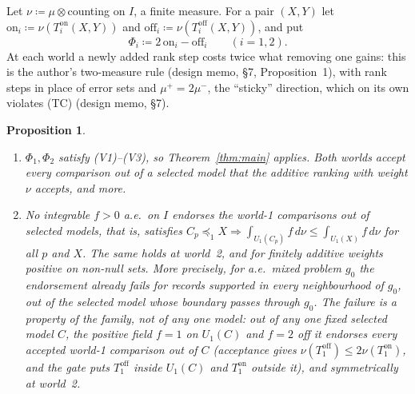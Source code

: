 \documentclass[11pt]{article}
\newtheorem{proposition}[theorem]{Proposition}
\theoremstyle{definition}\newtheorem{definition}[theorem]{Definition}
\theoremstyle{remark}\newtheorem{remark}[theorem]{Remark}
\newcommand{\on}{\mathrm{on}}
\newcommand{\off}{\mathrm{off}}
\begin{document}
Let $\nu\coloneqq\mu\otimes$counting on $I$, a finite measure. For a pair
$(X,Y)$ let $\on_i\coloneqq\nu(T^\on_i(X,Y))$ and
$\off_i\coloneqq\nu(T^\off_i(X,Y))$, and put
\[
 \Phi_i\coloneqq2\,\on_i-\off_i\qquad(i=1,2).
\]
At each world a newly added rank step costs twice what removing one gains:
this is the author's two-measure rule (design memo, \S7, Proposition~1), with
rank steps in place of error sets and $\mu^+=2\mu^-$, the ``sticky''
direction, which on its own violates (TC) (design memo, \S7).

\begin{proposition}\label{prop:instance}
\begin{enumerate}[label=(\alph*),leftmargin=*,itemsep=2pt]
\item $\Phi_1,\Phi_2$ satisfy (V1)--(V3), so Theorem~\ref{thm:main} applies.
Both worlds accept every comparison out of a selected model that the additive
ranking with weight $\nu$ accepts, and more.
\item No integrable $f>0$ a.e.\ on $I$ endorses the world-1 comparisons out of
selected models, that is, satisfies
$C_p\preceq_1X\Rightarrow\int_{U_1(C_p)}f\,d\nu\le\int_{U_1(X)}f\,d\nu$ for all
$p$ and $X$. The same holds at world~2, and for finitely additive weights
positive on non-null sets. More precisely, for a.e.\ mixed problem $g_0$ the
endorsement already fails for records supported in every neighbourhood of
$g_0$, out of the selected model whose boundary passes through $g_0$. The
failure is a property of the family, not of any one model: out of any one fixed
selected model $C$, the positive field $f=1$ on $U_1(C)$ and $f=2$ off it
endorses every accepted world-1 comparison out of $C$ (acceptance gives
$\nu(T^\off_1)\le2\nu(T^\on_1)$, and the gate puts $T^\off_1$ inside $U_1(C)$
and $T^\on_1$ outside it), and symmetrically at world~2.
\end{enumerate}
\end{proposition}
\end{document}
